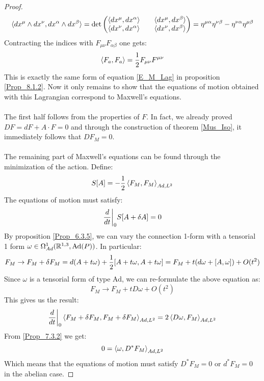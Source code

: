 \documentclass[12pt,a4paper]{report}
\theoremstyle{definition}
\theoremstyle{Theorem}
\theoremstyle{definition}
\theoremstyle{definition}
\begin{document}
\begin{proof}
		$$\braket{dx^\mu\wedge dx^\nu,dx^\alpha\wedge dx^\beta}=\det 
		\begin{pmatrix}
			\braket{dx^\mu,dx^\alpha} && \braket{dx^\mu,dx^\beta}\\
			\braket{dx^\nu,dx^\alpha} && \braket{dx^\nu,dx^\beta}\\
		\end{pmatrix}=\eta^{\mu\alpha}\eta^{\nu\beta}-\eta^{\nu\alpha}\eta^{\mu\beta}$$
		Contracting the indices with $F_{\mu\nu}F_{\alpha\beta}$ one gets:
		$$\braket{F_a,F_a}={1\over 2}F_{\mu\nu} F^{\mu\nu}$$
		This is exactly the same form of equation \ref{E_M_Lag} in proposition \ref{Prop_8.1.2}. Now it only remains to show that the equations of motion obtained with this Lagrangian correspond to Maxwell's equations. \\\\
		The first half follows from the properties of $F$. In fact, we already proved $DF=dF+A\cdot F=0$ and through the construction of theorem \ref{Mus_Iso}, it immediately follows that $DF_M=0$.\\
		\\
		The remaining part of Maxwell's equations can be found through the minimization of the action. Define:
		$$S[A]=-{1\over 2}\braket{F_M,F_M}_{Ad,L^2}$$
		The equations of motion must satisfy:
		$${d\over dt}\bigg|_0S[A+\delta A]=0$$
		By proposition \ref{Prop_6.3.5}, we can vary the connection 1-form with a tensorial 1 form $\omega\in\Omega^1_{Ad}(\mathbb{R}^{1,3},\hbox{Ad}(P))$. In particular:
		$$F_M\rightarrow F_M+\delta F_M= d(A+t\omega)+{1\over 2}[A+t\omega,A+t\omega]=F_M+t(d\omega+[A,\omega])+O(t^2)$$
		Since $\omega$ is a tensorial form of type Ad, we can re-formulate the above equation as:
		$$F_M\rightarrow F_M+tD\omega+O(t^2)$$
		This gives us the result:
		$${d\over dt}\bigg|_0\braket{F_M+\delta F_M,F_M+\delta F_M}_{Ad,L^2}=2\braket{D\omega,F_M}_{Ad,L^2}$$
		From \ref{Prop_7.3.2} we get:
		$$0=\braket{\omega,D^*F_M}_{Ad,L^2}$$
		Which means that the equations of motion must satisfy $D^*F_M=0$ or $d^*F_M=0$ in the abelian case.
	\end{proof}
\end{document}
